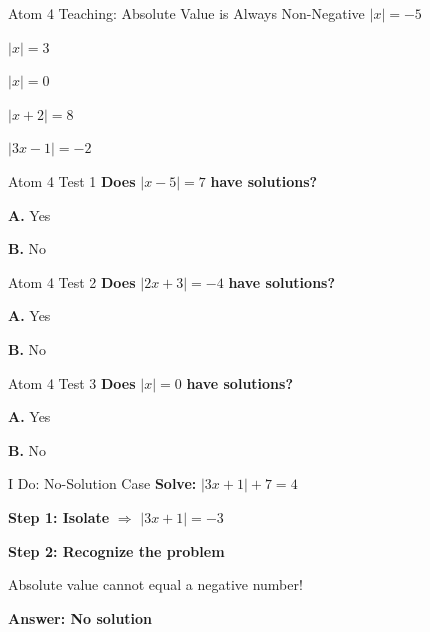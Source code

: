 \documentclass[12pt]{beamer}
\begin{document}
\begin{frame}{Atom 4 Teaching: Absolute Value is Always Non-Negative}
$|x| = -5$ \pause {}

\pause
\vspace{0.5cm}

$|x| = 3$ \pause {}

\pause
\vspace{0.5cm}

$|x| = 0$ \pause {}

\pause
\vspace{0.5cm}

$|x + 2| = 8$ \pause {}

\pause
\vspace{0.5cm}

$|3x - 1| = -2$ \pause {}
\end{frame}

\begin{frame}{Atom 4 Test 1}
\textbf{Does} $|x - 5| = 7$ \textbf{have solutions?}

\vspace{1cm}

\textbf{A.} Yes \hfill {}

\textbf{B.} No
\end{frame}

\begin{frame}{Atom 4 Test 2}
\textbf{Does} $|2x + 3| = -4$ \textbf{have solutions?}

\vspace{1cm}

\textbf{A.} Yes

\textbf{B.} No \hfill {}
\end{frame}

\begin{frame}{Atom 4 Test 3}
\textbf{Does} $|x| = 0$ \textbf{have solutions?}

\vspace{1cm}

\textbf{A.} Yes \hfill {}

\textbf{B.} No
\end{frame}

\begin{frame}{I Do: No-Solution Case}
\textbf{Solve:} $|3x + 1| + 7 = 4$

\pause
\vspace{0.5cm}

\textbf{Step 1: Isolate} $\Rightarrow$ $|3x + 1| = -3$

\pause
\vspace{0.5cm}

\textbf{Step 2: Recognize the problem}

Absolute value cannot equal a negative number!

\pause
\vspace{0.5cm}

\Large
\textbf{Answer: No solution}
\end{frame}
\end{document}
